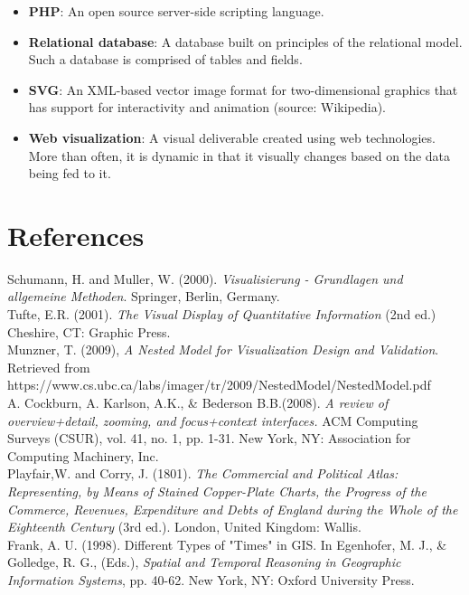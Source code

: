 \documentclass[12pt]{article}
\begin{document}
{\begin{itemize}
\item[] \textbf{PHP}: An open source server-side scripting language.
\item[] \textbf{Relational database}: A database built on principles of the relational model. Such a database is comprised of tables and fields.
\item[] \textbf{SVG}: An XML-based vector image format for two-dimensional graphics that has support for interactivity and animation (source: Wikipedia).
\item[] \textbf{Web visualization}: A visual deliverable created using web technologies. More than often, it is dynamic in that it visually changes based on the data being fed to it. 
\end{itemize}

\newpage

\section{References}

\noindent Schumann, H. and Muller, W. (2000). {\em Visualisierung - Grundlagen und allgemeine Methoden}. Springer, Berlin, Germany.\\

\noindent Tufte, E.R. (2001). {\em The Visual Display of Quantitative Information} (2nd ed.) Cheshire, CT: Graphic Press.\\

\noindent Munzner, T. (2009), {\em A Nested Model for Visualization Design and Validation}. Retrieved from \\ https://www.cs.ubc.ca/labs/imager/tr/2009/NestedModel/NestedModel.pdf\\

\noindent A. Cockburn, A. Karlson, A.K., \& Bederson B.B.(2008). {\em A review of overview+detail, zooming, and focus+context interfaces.} ACM Computing Surveys (CSUR), vol. 41, no. 1, pp. 1-31. New York, NY: Association for Computing Machinery, Inc.\\
  
\noindent Playfair,W. and Corry, J. (1801). {\em The Commercial and Political Atlas: Representing,
by Means of Stained Copper-Plate Charts, the Progress of the Commerce,
Revenues, Expenditure and Debts of England during the Whole of
the Eighteenth Century} (3rd ed.). London, United Kingdom: Wallis.\\
  
\noindent Frank, A. U. (1998). Different Types of "Times" in GIS. In Egenhofer, M. J.,
\& Golledge, R. G., (Eds.), {\em Spatial and Temporal Reasoning in Geographic
Information Systems}, pp. 40-62. New York, NY: Oxford University Press.\\

}
\end{document}
